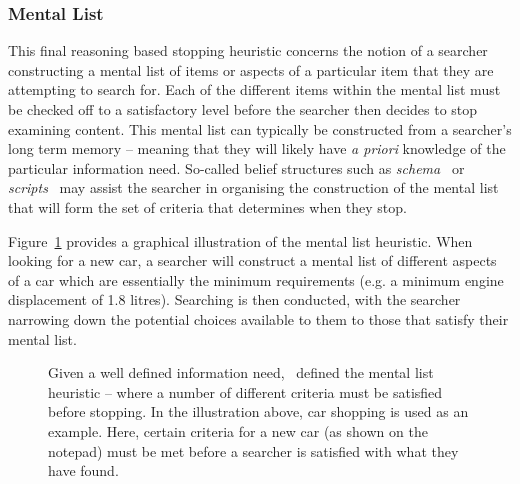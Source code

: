 \subsubsection{Mental List}
This final reasoning based stopping heuristic concerns the notion of a searcher constructing a mental list of items or aspects of a particular item that they are attempting to search for. Each of the different items within the mental list must be checked off to a satisfactory level before the searcher then decides to stop examining content. This mental list can typically be constructed from a searcher's long term memory -- meaning that they will likely have \emph{a priori} knowledge of the particular information need. So-called belief structures such as \emph{schema}~\citep{bartlett1933remembering} or \emph{scripts}~\citep{schank1977scripts} may assist the searcher in organising the construction of the mental list that will form the set of criteria that determines when they stop.

Figure~\ref{fig:mental_list} provides a graphical illustration of the mental list heuristic. When looking for a new car, a searcher will construct a mental list of different aspects of a car which are essentially the minimum requirements (e.g. a minimum engine displacement of 1.8 litres). Searching is then conducted, with the searcher narrowing down the potential choices available to them to those that satisfy their mental list.

\begin{figure}[t!]
    \centering
    \caption[The mental list stopping heuristic]{Given a well defined information need,~\cite{nickles1995judgment} defined the mental list heuristic – where a number of different criteria must be satisfied before stopping. In the illustration above, car shopping is used as an example. Here, certain criteria for a new car (as shown on the notepad) must be met before a searcher is satisfied with what they have found.}
    \label{fig:mental_list}
\end{figure}

